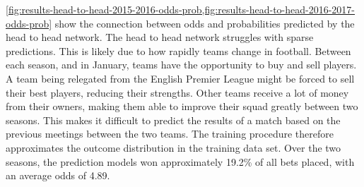 \cref{fig:results-head-to-head-2015-2016-odds-prob,fig:results-head-to-head-2016-2017-odds-prob} show the connection between odds and probabilities predicted by the head to head network. The head to head network struggles with sparse predictions. This is likely due to how rapidly teams change in football. Between each season, and in January, teams have the opportunity to buy and sell players. A team being relegated from the English Premier League might be forced to sell their best players, reducing their strengths. Other teams receive a lot of money from their owners, making them able to improve their squad greatly between two seasons. This makes it difficult to predict the results of a match based on the previous meetings between the two teams. The training procedure therefore approximates the outcome distribution in the training data set. Over the two seasons, the prediction models won approximately 19.2\% of all bets placed, with an average odds of 4.89.